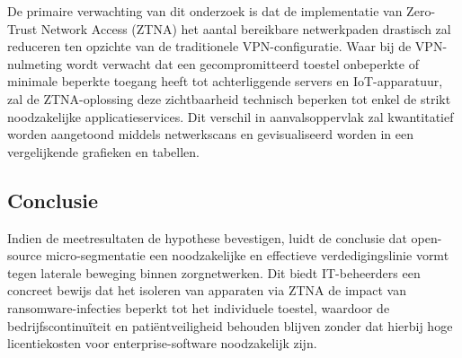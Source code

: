 De primaire verwachting van dit onderzoek is dat de implementatie van Zero-Trust Network Access (ZTNA) het aantal bereikbare netwerkpaden drastisch zal reduceren ten opzichte van de traditionele VPN-configuratie. Waar bij de VPN-nulmeting wordt verwacht dat een gecompromitteerd toestel onbeperkte of minimale beperkte toegang heeft tot achterliggende servers en IoT-apparatuur, zal de ZTNA-oplossing deze zichtbaarheid technisch beperken tot enkel de strikt noodzakelijke applicatieservices. Dit verschil in aanvalsoppervlak zal kwantitatief worden aangetoond middels netwerkscans en gevisualiseerd worden in een vergelijkende grafieken en tabellen.

\subsection{Conclusie}
Indien de meetresultaten de hypothese bevestigen, luidt de conclusie dat open-source micro-segmentatie een noodzakelijke en effectieve verdedigingslinie vormt tegen laterale beweging binnen zorgnetwerken. Dit biedt IT-beheerders een concreet bewijs dat het isoleren van apparaten via ZTNA de impact van ransomware-infecties beperkt tot het individuele toestel, waardoor de bedrijfscontinuïteit en patiëntveiligheid behouden blijven zonder dat hierbij hoge licentiekosten voor enterprise-software noodzakelijk zijn.
